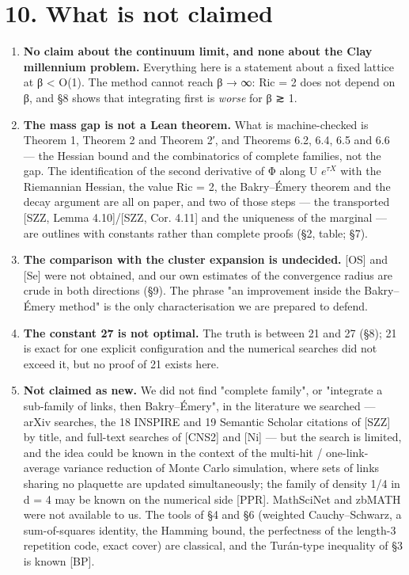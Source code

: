 \documentclass[11pt,a4paper]{article}
\theoremstyle{named}
\begin{document}
\section*{10. What is not claimed}
\begin{enumerate}
\item[1.] \textbf{No claim about the continuum limit, and none about the Clay millennium problem.} Everything here is a statement about a fixed lattice at β \textless{} O(1). The method cannot reach β → ∞: Ric = 2 does not depend on β, and §8 shows that integrating first is \textit{worse} for β ≳ 1.
\item[2.] \textbf{The mass gap is not a Lean theorem.} What is machine-checked is Theorem 1, Theorem 2 and Theorem 2′, and Theorems 6.2, 6.4, 6.5 and 6.6 — the Hessian bound and the combinatorics of complete families, not the gap. The identification of the second derivative of Φ along U $e^{τX}$ with the Riemannian Hessian, the value Ric = 2, the Bakry–Émery theorem and the decay argument are all on paper, and two of those steps — the transported [SZZ, Lemma 4.10]/[SZZ, Cor. 4.11] and the uniqueness of the marginal — are outlines with constants rather than complete proofs (§2, table; §7).
\item[3.] \textbf{The comparison with the cluster expansion is undecided.} [OS] and [Se] were not obtained, and our own estimates of the convergence radius are crude in both directions (§9). The phrase "an improvement inside the Bakry–Émery method" is the only characterisation we are prepared to defend.
\item[4.] \textbf{The constant 27 is not optimal.} The truth is between 21 and 27 (§8); 21 is exact for one explicit configuration and the numerical searches did not exceed it, but no proof of 21 exists here.
\item[5.] \textbf{Not claimed as new.} We did not find "complete family", or "integrate a sub-family of links, then Bakry–Émery", in the literature we searched — arXiv searches, the 18 INSPIRE and 19 Semantic Scholar citations of [SZZ] by title, and full-text searches of [CNS2] and [Ni] — but the search is limited, and the idea could be known in the context of the multi-hit / one-link-average variance reduction of Monte Carlo simulation, where sets of links sharing no plaquette are updated simultaneously; the family of density 1/4 in d = 4 may be known on the numerical side [PPR]. MathSciNet and zbMATH were not available to us. The tools of §4 and §6 (weighted Cauchy–Schwarz, a sum-of-squares identity, the Hamming bound, the perfectness of the length-3 repetition code, exact cover) are classical, and the Turán-type inequality of §3 is known [BP].

\end{enumerate}
\end{document}
